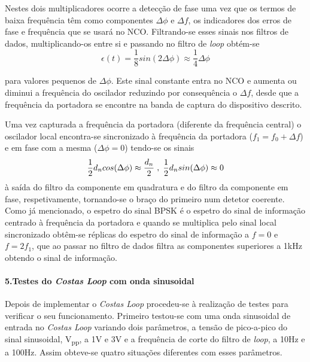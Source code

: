 \documentclass[11pt]{article}
\numberwithin{equation}{section}
\begin{document}
	Nestes dois multiplicadores ocorre a detecção de fase uma vez que os termos de baixa frequência têm como componentes $\Delta\phi$ e $\Delta f$, os indicadores dos erros de fase e frequência que se usará no NCO. Filtrando-se esses sinais nos filtros de dados, multiplicando-os entre si e passando no filtro de \textit{loop} obtém-se 
	\begin{equation}
	\epsilon(t)=\frac{1}{8}sin(2\Delta\phi)\approx\frac{1}{4}\Delta\phi
	\end{equation}
	
	para valores pequenos de $\Delta\phi$. Este sinal constante entra no NCO e aumenta ou diminui a frequência do oscilador reduzindo por consequência o $\Delta f$, desde que a frequência da portadora se encontre na banda de captura do dispositivo descrito.
	
	Uma vez capturada a frequência da portadora (diferente da frequência central) o oscilador local encontra-se sincronizado à frequência da portadora ($f_1 = f_0+\Delta f$) e em fase com a mesma ($\Delta\phi=0$) tendo-se os sinais
	\begin{equation}
	\frac{1}{2}d_ncos(\Delta\phi)\approx\dfrac{d_n}{2} \hspace{1mm}, \hspace{1mm} \frac{1}{2}d_nsin(\Delta\phi)\approx 0
	\end{equation}
	à saída do filtro da componente em quadratura e do filtro da componente em fase, respetivamente, tornando-se o braço do primeiro num detetor coerente. Como já mencionado, o espetro do sinal BPSK é o espetro do sinal de informação centrado à frequência da portadora e quando se multiplica pelo sinal local sincronizado obtêm-se réplicas do espetro do sinal de informação a $f=0$ e $f=2f_1$, que ao passar no filtro de dados filtra as componentes superiores a 1kHz obtendo o sinal de informação.
	
	\paragraph{5.Testes do \textit{Costas Loop} com onda sinusoidal} \hspace{0pt} \label{para:P3-5}
	
	Depois de implementar o \textit{Costas Loop} procedeu-se à realização de testes para verificar o seu funcionamento. Primeiro testou-se com uma onda sinusoidal de entrada no \textit{Costas Loop} variando dois parâmetros, a  tensão de pico-a-pico do sinal sinusoidal, V\textsubscript{pp}, a 1V e 3V e a frequência de corte do filtro de \textit{loop}, a 10Hz e a 100Hz. Assim obteve-se quatro situações diferentes com esses parâmetros.
	
\end{document}
